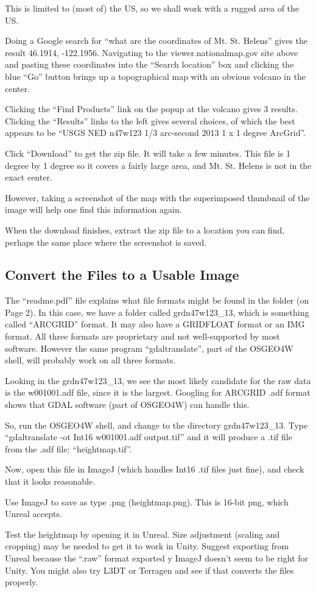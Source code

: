 \documentclass[letter,12pt]{article}
\begin{document}
This is limited to  (most of) the US, so we shall work with a rugged area of the US.

Doing a Google search for “what are the coordinates of Mt. St. Helens” gives the result 46.1914, -122.1956.  Navigating to the viewer.nationalmap.gov site above and pasting these coordinates into the “Search location” box and clicking the blue “Go” button brings up a topographical map with an obvious volcano in the center.

Clicking the “Find Products” link on the popup at the volcano gives 3 results.  Clicking the “Results” links to the left gives several choices, of which the best appears to be  “USGS NED n47w123 1/3 arc-second 2013 1 x 1 degree ArcGrid”.

Click “Download” to get the zip file.  It will take a few minutes.  This file is 1 degree by 1 degree so it covers a fairly large area, and Mt. St. Helens is not in the exact center.

However, taking a screenshot of the map with the superimposed thumbnail of the image will help one find this information again.

When the download finishes, extract the zip file to a location you can find, perhaps the same place where the screenshot is saved.

\subsection{Convert the Files to a Usable Image}

The “readme.pdf” file explains what file formats might be found in the folder (on Page 2). In this case, we have a folder called grdn47w123\_13, which is something called “ARCGRID” format.  It may also have a GRIDFLOAT format or an IMG format.  All three formats are proprietary and not well-supported by most software.  However the same program “gdaltranslate”, part of the OSGEO4W shell, will probably work on all three formats.

Looking in the grdn47w123\_13, we see the most likely candidate for the raw data is the w001001.adf file, since it is the largest.  Googling for ARCGRID .adf format shows that GDAL software (part of OSGEO4W) can handle this.

So, run the OSGEO4W shell, and change to the directory grdn47w123\_13.  Type “gdaltranslate -ot Int16 w001001.adf output.tif” and it will produce a .tif file from the .adf file: “heightmap.tif”.

Now, open this file in ImageJ (which handles Int16 .tif files just fine), and check that it looks reasonable.  

Use ImageJ to save as type .png (heightmap.png).  This is 16-bit png, which Unreal accepts.

Test the heightmap by opening it in Unreal.  Size adjustment (scaling and cropping) may be needed to get it to work in Unity.  Suggest exporting from Unreal because the “.raw” format exported y ImageJ doesn’t seem to be right for Unity.  You might also try L3DT or Terragen and see if that converts the files properly.
\end{document}
